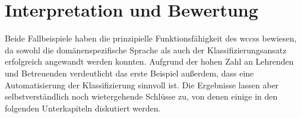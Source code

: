 \section{Interpretation und Bewertung}
    \label{section:findingsInterpretation}
    Beide Fallbeispiele haben die prinzipielle Funktionsfähigkeit des \glspl{wccs} bewiesen,
    da sowohl die domänenspezifische Sprache als auch der Klassifizierungsansatz
    erfolgreich angewandt werden konnten.
    Aufgrund der hohen Zahl an Lehrenden und Betreuenden
    verdeutlicht das erste Beispiel außerdem,
    dass eine Automatisierung der Klassifizierung sinnvoll ist.
    Die Ergebnisse lassen aber selbstverständlich noch wietergehende Schlüsse zu,
    von denen einige in den folgenden Unterkapiteln diskutiert werden.

    
    
    
    
    
